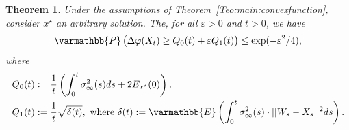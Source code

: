 \documentclass[11pt,reqno]{article}
\let\mathbb=\varmathbb
\renewcommand{\epsilon}{\varepsilon}
\newcommand{\1}{\mathds{1}}
\numberwithin{equation}{section}  %
\theoremstyle{plain}
\newtheorem{theorem}{Theorem}
\theoremstyle{definition}
\theoremstyle{remark}
\numberwithin{theorem}{section}
\numberwithin{remark}{section}
\numberwithin{example}{section}
\begin{document}
\begin{theorem}
Under the assumptions of Theorem~\ref{Teo:main:convexfunction}, consider $x^{\star}$   an arbitrary solution. The, for all $\epsilon>0$ and $t>0$, we have
\begin{equation}
\mathbb{P}\left(\Delta\varphi(\bar{X}_{t})\geq Q_{0}(t)+\epsilon Q_{1}(t) \right)\leq \exp(-\epsilon^{2}/4),
\end{equation}
where 
\begin{align}
Q_{0}(t)&:= \frac{1}{t}\left(\int_{0}^{t}\sigma^{2}_{\infty}(s)ds+2 E_{x^{\star}}(0)\right),\\
Q_{1}(t)&:=  \frac{1}{t}\sqrt{\delta(t)},\text{ where }\delta(t):={\mathbb{E}}\left(\int_{0}^{t}\sigma^{2}_{\infty}(s)\cdot||W_{s}-X_{s}||^{2}ds\right).
\end{align}
\end{theorem}
\end{document}
